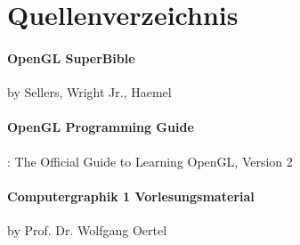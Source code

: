 \documentclass[12pt]{article}
\begin{document}
\bigbreak
\section{Quellenverzeichnis}
\paragraph{OpenGL SuperBible} by Sellers, Wright Jr., Haemel

\paragraph{OpenGL Programming Guide}: The Official Guide to Learning OpenGL, Version 2 

\paragraph{Computergraphik 1 Vorlesungsmaterial} by Prof. Dr. Wolfgang Oertel 
\end{document}

